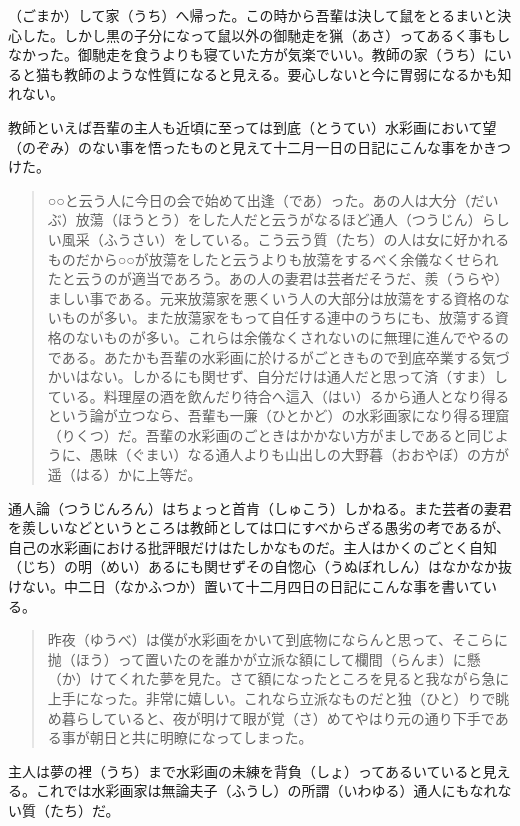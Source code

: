\documentclass{book}
\begin{document}
（ごまか）して家（うち）へ帰った。この時から吾輩は決して鼠をとるまいと決心した。しかし黒の子分になって鼠以外の御馳走を猟（あさ）ってあるく事もしなかった。御馳走を食うよりも寝ていた方が気楽でいい。教師の家（うち）にいると猫も教師のような性質になると見える。要心しないと今に胃弱になるかも知れない。

教師といえば吾輩の主人も近頃に至っては到底（とうてい）水彩画において望（のぞみ）のない事を悟ったものと見えて十二月一日の日記にこんな事をかきつけた。

\blockquote{○○と云う人に今日の会で始めて出逢（であ）った。あの人は大分（だいぶ）放蕩（ほうとう）をした人だと云うがなるほど通人（つうじん）らしい風采（ふうさい）をしている。こう云う質（たち）の人は女に好かれるものだから○○が放蕩をしたと云うよりも放蕩をするべく余儀なくせられたと云うのが適当であろう。あの人の妻君は芸者だそうだ、羨（うらや）ましい事である。元来放蕩家を悪くいう人の大部分は放蕩をする資格のないものが多い。また放蕩家をもって自任する連中のうちにも、放蕩する資格のないものが多い。これらは余儀なくされないのに無理に進んでやるのである。あたかも吾輩の水彩画に於けるがごときもので到底卒業する気づかいはない。しかるにも関せず、自分だけは通人だと思って済（すま）している。料理屋の酒を飲んだり待合へ這入（はい）るから通人となり得るという論が立つなら、吾輩も一廉（ひとかど）の水彩画家になり得る理窟（りくつ）だ。吾輩の水彩画のごときはかかない方がましであると同じように、愚昧（ぐまい）なる通人よりも山出しの大野暮（おおやぼ）の方が遥（はる）かに上等だ。}

通人論（つうじんろん）はちょっと首肯（しゅこう）しかねる。また芸者の妻君を羨しいなどというところは教師としては口にすべからざる愚劣の考であるが、自己の水彩画における批評眼だけはたしかなものだ。主人はかくのごとく自知（じち）の明（めい）あるにも関せずその自惚心（うぬぼれしん）はなかなか抜けない。中二日（なかふつか）置いて十二月四日の日記にこんな事を書いている。

\blockquote{昨夜（ゆうべ）は僕が水彩画をかいて到底物にならんと思って、そこらに抛（ほう）って置いたのを誰かが立派な額にして欄間（らんま）に懸（か）けてくれた夢を見た。さて額になったところを見ると我ながら急に上手になった。非常に嬉しい。これなら立派なものだと独（ひと）りで眺め暮らしていると、夜が明けて眼が覚（さ）めてやはり元の通り下手である事が朝日と共に明瞭になってしまった。}

主人は夢の裡（うち）まで水彩画の未練を背負（しょ）ってあるいていると見える。これでは水彩画家は無論夫子（ふうし）の所謂（いわゆる）通人にもなれない質（たち）だ。
\end{document}
